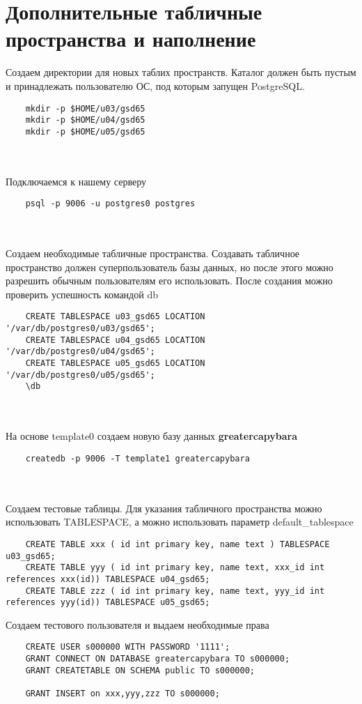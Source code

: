 \documentclass{article}
\begin{document}
\section{Дополнительные табличные пространства и наполнение}
Создаем директории для новых таблих пространств. Каталог должен быть пустым и принадлежать пользователю ОС, под которым запущен PostgreSQL.
\begin{verbatim}
    mkdir -p $HOME/u03/gsd65
    mkdir -p $HOME/u04/gsd65
    mkdir -p $HOME/u05/gsd65
\end{verbatim}
\\ \\ 
Подключаемся к нашему серверу
\begin{verbatim}
    psql -p 9006 -u postgres0 postgres
\end{verbatim}
\\ \\ 
Создаем необходимые табличные пространства. 
Создавать табличное пространство должен суперпользователь базы данных, но после этого можно разрешить обычным пользователям его использовать. После создания можно проверить успешность командой db
\begin{verbatim}
    CREATE TABLESPACE u03_gsd65 LOCATION '/var/db/postgres0/u03/gsd65';
    CREATE TABLESPACE u04_gsd65 LOCATION '/var/db/postgres0/u04/gsd65';
    CREATE TABLESPACE u05_gsd65 LOCATION '/var/db/postgres0/u05/gsd65';
    \db
\end{verbatim}
\\ \\ 
На основе template0 создаем новую базу данных \textbf{greatercapybara}
\begin{verbatim}
    createdb -p 9006 -T template1 greatercapybara
\end{verbatim}
\\ \\ 
Создаем тестовые таблицы. Для указания табличного пространства можно использовать TABLESPACE, а можно использовать параметр default\_tablespace 
\begin{verbatim}
    CREATE TABLE xxx ( id int primary key, name text ) TABLESPACE u03_gsd65;
    CREATE TABLE yyy ( id int primary key, name text, xxx_id int references xxx(id)) TABLESPACE u04_gsd65;
    CREATE TABLE zzz ( id int primary key, name text, yyy_id int references yyy(id)) TABLESPACE u05_gsd65;
\end{verbatim}
Создаем тестового пользователя и выдаем необходимые права
\begin{verbatim}
    CREATE USER s000000 WITH PASSWORD '1111';
    GRANT CONNECT ON DATABASE greatercapybara TO s000000;
    GRANT CREATETABLE ON SCHEMA public TO s000000;

    GRANT INSERT on xxx,yyy,zzz TO s000000;
\end{verbatim}
\end{document}
